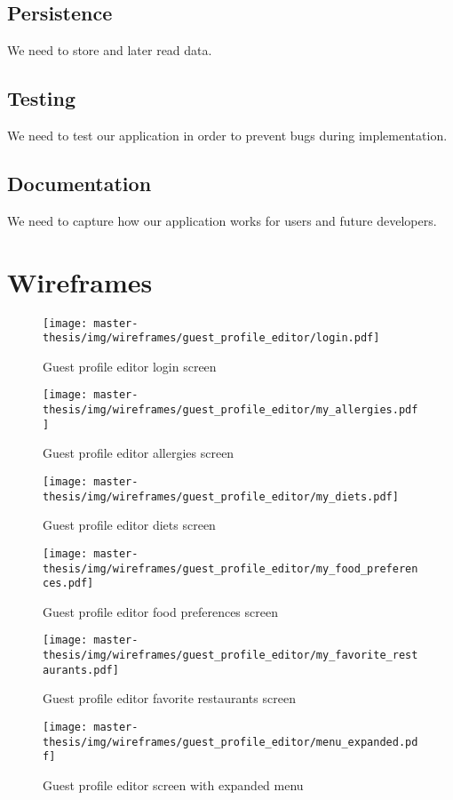 \subsection{Persistence}
We need to store and later read data.

\subsection{Testing}
We need to test our application in order to prevent bugs during implementation.

\subsection{Documentation}
We need to capture how our application works for users and future developers.

\section{Wireframes}
\begin{figure}[h]
  \centering
  \texttt{[image: master-thesis/img/wireframes/guest\_profile\_editor/login.pdf]}
  \caption{Guest profile editor login screen}
\end{figure}

\begin{figure}[h]
  \centering
  \texttt{[image: master-thesis/img/wireframes/guest\_profile\_editor/my\_allergies.pdf]}
  \caption{Guest profile editor allergies screen}
\end{figure}

\begin{figure}[h]
  \centering
  \texttt{[image: master-thesis/img/wireframes/guest\_profile\_editor/my\_diets.pdf]}
  \caption{Guest profile editor diets screen}
\end{figure}

\begin{figure}[h]
  \centering
  \texttt{[image: master-thesis/img/wireframes/guest\_profile\_editor/my\_food\_preferences.pdf]}
  \caption{Guest profile editor food preferences screen}
\end{figure}

\begin{figure}[h]
  \centering
  \texttt{[image: master-thesis/img/wireframes/guest\_profile\_editor/my\_favorite\_restaurants.pdf]}
  \caption{Guest profile editor favorite restaurants screen}
\end{figure}

\begin{figure}[h]
  \centering
  \texttt{[image: master-thesis/img/wireframes/guest\_profile\_editor/menu\_expanded.pdf]}
  \caption{Guest profile editor screen with expanded menu}
\end{figure}

\listoftodos